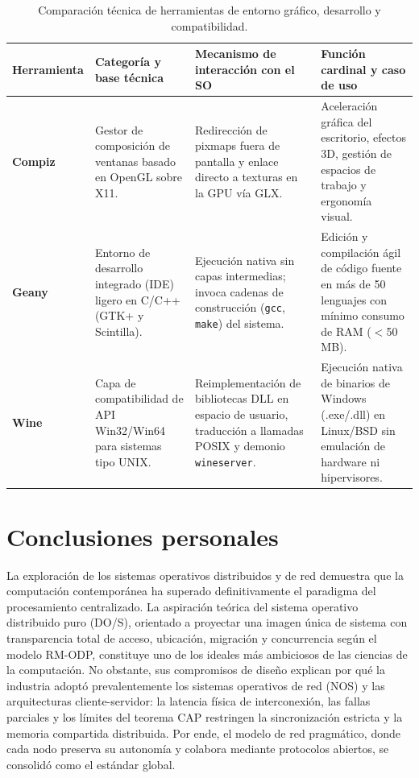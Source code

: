 \documentclass[12pt]{article}
\begin{document}
\begin{table}[H]
\centering
\small
\renewcommand{\arraystretch}{1.15}
\renewcommand{\tabularxcolumn}[1]{m{#1}}
\setlength{\emergencystretch}{1.5em}
\caption{Comparación técnica de herramientas de entorno gráfico, desarrollo y compatibilidad.}
\label{tab:comparativaHerramientas}
\begin{tabularx}{\textwidth}{>{\centering\arraybackslash}m{2.4cm} X X X}
\toprule
\textbf{Herramienta} & \textbf{Categoría y base técnica} & \textbf{Mecanismo de interacción con el SO} & \textbf{Función cardinal y caso de uso} \\
\midrule
\textbf{Compiz} & Gestor de composición de ventanas basado en OpenGL sobre X11. & Redirección de pixmaps fuera de pantalla y enlace directo a texturas en la GPU vía GLX. & Aceleración gráfica del escritorio, efectos 3D, gestión de espacios de trabajo y ergonomía visual. \\
\addlinespace
\textbf{Geany} & Entorno de desarrollo integrado (IDE) ligero en C/C++ (GTK+ y Scintilla). & Ejecución nativa sin capas intermedias; invoca cadenas de construcción (\texttt{gcc}, \texttt{make}) del sistema. & Edición y compilación ágil de código fuente en más de 50 lenguajes con mínimo consumo de RAM ($<$50 MB). \\
\addlinespace
\textbf{Wine} & Capa de compatibilidad de API Win32/Win64 para sistemas tipo UNIX. & Reimplementación de bibliotecas DLL en espacio de usuario, traducción a llamadas POSIX y demonio \texttt{wineserver}. & Ejecución nativa de binarios de Windows (.exe/.dll) en Linux/BSD sin emulación de hardware ni hipervisores. \\
\bottomrule
\end{tabularx}
\end{table}

\section{Conclusiones personales}
\label{sec:conclusionesPersonales}

La exploración de los sistemas operativos distribuidos y de red demuestra que la computación contemporánea ha superado definitivamente el paradigma del procesamiento centralizado. La aspiración teórica del sistema operativo distribuido puro (DO/S), orientado a proyectar una imagen única de sistema con transparencia total de acceso, ubicación, migración y concurrencia según el modelo RM-ODP, constituye uno de los ideales más ambiciosos de las ciencias de la computación. No obstante, sus compromisos de diseño explican por qué la industria adoptó prevalentemente los sistemas operativos de red (NOS) y las arquitecturas cliente-servidor: la latencia física de interconexión, las fallas parciales y los límites del teorema CAP restringen la sincronización estricta y la memoria compartida distribuida. Por ende, el modelo de red pragmático, donde cada nodo preserva su autonomía y colabora mediante protocolos abiertos, se consolidó como el estándar global.
\end{document}
